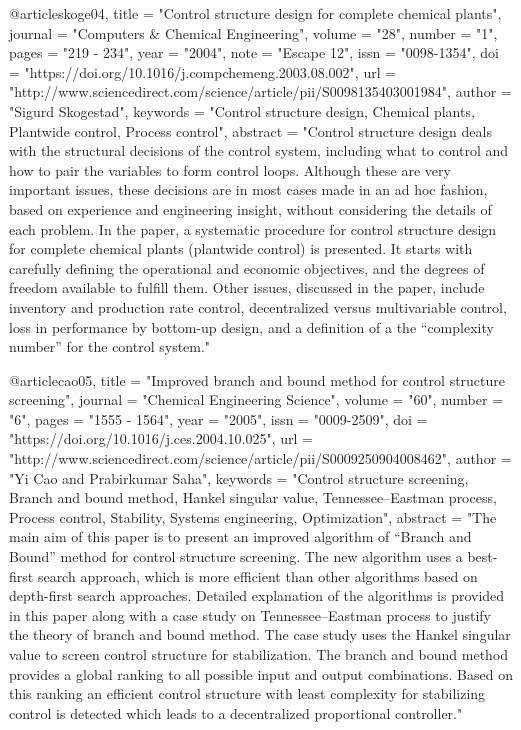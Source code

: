@article{skoge04,
title = "Control structure design for complete chemical plants",
journal = "Computers & Chemical Engineering",
volume = "28",
number = "1",
pages = "219 - 234",
year = "2004",
note = "Escape 12",
issn = "0098-1354",
doi = "https://doi.org/10.1016/j.compchemeng.2003.08.002",
url = "http://www.sciencedirect.com/science/article/pii/S0098135403001984",
author = "Sigurd Skogestad",
keywords = "Control structure design, Chemical plants, Plantwide control, Process control",
abstract = "Control structure design deals with the structural decisions of the control system, including what to control and how to pair the variables to form control loops. Although these are very important issues, these decisions are in most cases made in an ad hoc fashion, based on experience and engineering insight, without considering the details of each problem. In the paper, a systematic procedure for control structure design for complete chemical plants (plantwide control) is presented. It starts with carefully defining the operational and economic objectives, and the degrees of freedom available to fulfill them. Other issues, discussed in the paper, include inventory and production rate control, decentralized versus multivariable control, loss in performance by bottom-up design, and a definition of a the “complexity number” for the control system."
}

@article{cao05,
title = "Improved branch and bound method for control structure screening",
journal = "Chemical Engineering Science",
volume = "60",
number = "6",
pages = "1555 - 1564",
year = "2005",
issn = "0009-2509",
doi = "https://doi.org/10.1016/j.ces.2004.10.025",
url = "http://www.sciencedirect.com/science/article/pii/S0009250904008462",
author = "Yi Cao and Prabirkumar Saha",
keywords = "Control structure screening, Branch and bound method, Hankel singular value, Tennessee–Eastman process, Process control, Stability, Systems engineering, Optimization",
abstract = "The main aim of this paper is to present an improved algorithm of “Branch and Bound” method for control structure screening. The new algorithm uses a best-first search approach, which is more efficient than other algorithms based on depth-first search approaches. Detailed explanation of the algorithms is provided in this paper along with a case study on Tennessee–Eastman process to justify the theory of branch and bound method. The case study uses the Hankel singular value to screen control structure for stabilization. The branch and bound method provides a global ranking to all possible input and output combinations. Based on this ranking an efficient control structure with least complexity for stabilizing control is detected which leads to a decentralized proportional controller."
}



